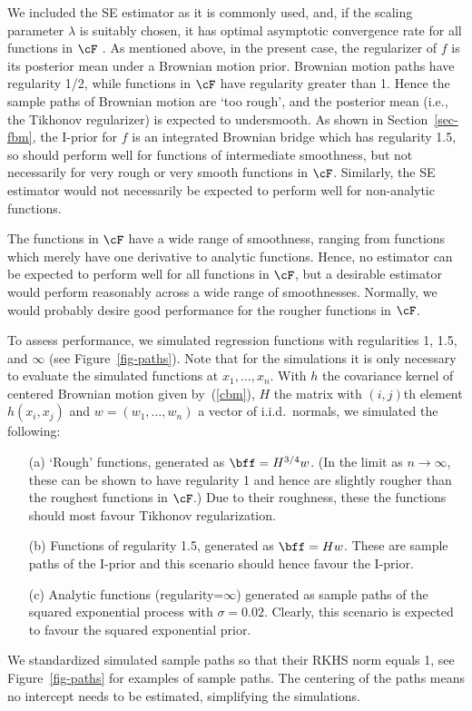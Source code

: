 \documentclass[preprint,12pt,authoryear]{elsarticle}
\begin{document}
We included the SE estimator as it is commonly used, and, if the scaling parameter $\lambda$ is suitably chosen, it has optimal asymptotic convergence rate for all functions in $\cF$ \citep{vz07}. 
As mentioned above, in the present case, the regularizer of $f$ is its posterior mean under a Brownian motion prior. 
Brownian motion paths have regularity 1/2, while functions in $\cF$ have regularity greater than 1. Hence the sample paths of Brownian motion are `too rough', and the posterior mean (i.e., the Tikhonov regularizer) is expected to undersmooth. 
As shown in Section~\ref{sec-fbm}, the I-prior for $f$ is an integrated Brownian bridge which has regularity 1.5, so should perform well for functions of intermediate smoothness, but not necessarily for very rough or very smooth functions in $\cF$. Similarly, the SE estimator would not necessarily be expected to perform well for non-analytic functions.


The functions in $\cF$ have a wide range of smoothness, ranging from functions which merely have one derivative to analytic functions. Hence, no estimator can be expected to perform well for all functions in $\cF$, but a desirable estimator would perform reasonably across a wide range of smoothnesses. Normally, we would probably desire good performance for the rougher functions in $\cF$.


To assess performance, we simulated regression functions with regularities 1, 1.5, and $\infty$ (see Figure~\ref{fig-paths}). Note that for the simulations it is only necessary to evaluate the simulated functions at $x_1,\ldots,x_n$. With $h$ the covariance kernel of centered Brownian motion given by~(\ref{cbm}), $H$ the matrix with $(i,j)$th element $h(x_i,x_j)$ and $w=(w_1,\ldots,w_n)$ a vector of i.i.d.\  normals, we simulated the following:
\begin{enumerate}
	\item[(a)] `Rough' functions, generated as $\bff=H^{3/4}w$. (In the limit as $n\rightarrow\infty$, these can be shown to have regularity 1 and hence are slightly rougher than the roughest functions in $\cF$.) Due to their roughness, these the functions should most favour Tikhonov regularization.
	\item[(b)] Functions of regularity 1.5, generated as $\bff=Hw$. These are sample paths of the I-prior and this scenario should hence favour the I-prior.
	\item[(c)] Analytic functions (regularity=$\infty$) generated as sample paths of the squared exponential process with $\sigma=0.02$. Clearly, this scenario is expected to favour the squared exponential prior.
\end{enumerate}
We standardized simulated sample paths so that their RKHS norm equals 1, see Figure~\ref{fig-paths} for examples of sample paths.
The centering of the paths means no intercept needs to be estimated, simplifying the simulations.
\end{document}
